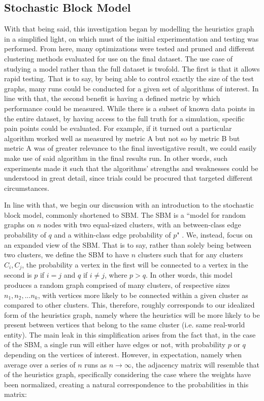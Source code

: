 \documentclass{article}
\begin{document}
\subsection{Stochastic Block Model}
With that being said, this investigation began by modelling the heuristics graph in a simplified light, on which must of the initial experimentation and testing was performed. From here, many optimizations were tested and pruned and different clustering methods evaluated for use on the final dataset. The use case of studying a model rather than the full dataset is twofold. The first is that it allows rapid testing. That is to say, by being able to control exactly the size of the test graphs, many runs could be conducted for a given set of algorithms of interest. In line with that, the second benefit is having a defined metric by which performance could be measured. While there is a subset of known data points in the entire dataset, by having access to the full truth for a simulation, specific pain points could be evaluated. For example, if it turned out a particular algorithm worked well as measured by metric A but not so by metric B but metric A was of greater relevance to the final investigative result, we could easily make use of said algorithm in the final results run. In other words, such experiments made it such that the algorithms' strengths and weaknesses could be understood in great detail, since trials could be procured that targeted different circumstances.

In line with that, we begin our discussion with an introduction to the stochastic block model, commonly shortened to SBM. The SBM is a ``model for random graphs on $n$ nodes with two equal-sized clusters, with an between-class edge probability of $q$ and a within-class edge probability of $p$" \cite{sbm}. We, instead, focus on an expanded view of the SBM. That is to say, rather than solely being between two clusters, we define the SBM to have $n$ clusters such that for any clusters $C_i, C_j$, the probability a vertex in the first will be connected to a vertex in the second is $p$ if $i=j$ and $q$ if $i\neq j$, where $p > q$. In other words, this model produces a random graph comprised of many clusters, of respective sizes $n_1,n_2,...n_k$, with vertices more likely to be connected within a given cluster as compared to other clusters. This, therefore, roughly corresponds to our idealized form of the heuristics graph, namely where the heuristics will be more likely to be present between vertices that belong to the same cluster (i.e. same real-world entity). The main leak in this simplification arises from the fact that, in the case of the SBM, a single run will either have edges or not, with probability $p$ or $q$ depending on the vertices of interest. However, in expectation, namely when average over a series of $n$ runs as $n\rightarrow\infty$, the adjacency matrix will resemble that of the heuristics graph, specifically considering the case where the weights have been normalized, creating a natural correspondence to the probabilities in this matrix:
\end{document}
